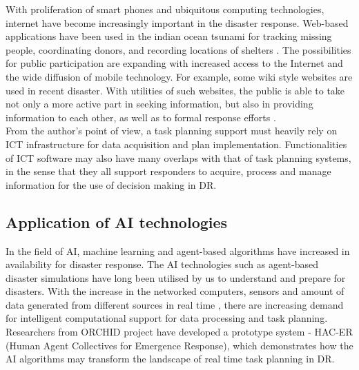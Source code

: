 With proliferation of smart phones and ubiquitous computing technologies, internet have become increasingly important in the disaster response. Web-based applications have been used in the indian ocean tsunami for tracking missing people, coordinating donors, and recording locations of shelters \cite{Wattegama2012}. The possibilities for public participation are expanding with increased access to the Internet and the wide diffusion of mobile technology. For example, some wiki style websites are used in recent disaster. With utilities of such websites, the public is able to take not only a more active part in seeking information, but also in providing information to each other, as well as to formal response efforts \cite{Palen2007}.\\

From the author's point of view, a task planning support must heavily rely on ICT infrastructure for data acquisition and plan implementation. Functionalities of ICT software may also have many overlaps with that of task planning systems, in the sense that they all support responders to acquire, process and manage information for the use of decision making in DR. \\


\subsection{Application of AI technologies}\label{sec:lraisupport}
In the field of AI, machine learning and agent-based algorithms have increased in availability for disaster response. The AI technologies such as agent-based disaster simulations \cite{Okaya} have long been utilised by us to understand and prepare for disasters. With the increase in the networked computers, sensors and amount of data generated from different sources in real time \cite{Ramchurn}, there are increasing demand for intelligent computational support for data processing and task planning. Researchers from ORCHID project have developed a prototype system - HAC-ER (Human Agent Collectives for Emergence Response), which demonstrates how the AI algorithms may transform the landscape of real time task planning in DR.\\


